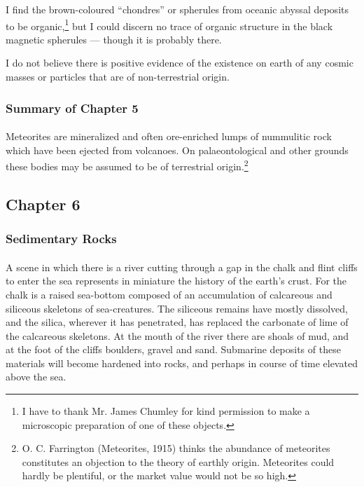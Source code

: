 \documentclass[a4paper, 12pt, oneside]{article}
\begin{document}
I find the brown-coloured ``chondres'' or spherules from oceanic abyssal deposits to be organic,\footnote{I have to thank Mr. James Chumley for kind permission to make a microscopic preparation of one of these objects.} but I could discern no trace of organic structure in the black magnetic spherules --- though it is probably there.

I do not believe there is positive evidence of the existence on earth of any cosmic masses or particles that are of non-terrestrial origin.

\subsubsection{Summary of Chapter 5}
\paragraph{}
Meteorites are mineralized and often ore-enriched lumps of nummulitic rock which have been ejected from volcanoes. On palaeontological and other grounds these bodies may be assumed to be of terrestrial origin.\footnote{O. C. Farrington (Meteorites, 1915) thinks the abundance of meteorites constitutes an objection to the theory of earthly origin. Meteorites could hardly be plentiful, or the market value would not be so high.}
\clearpage
\subsection{Chapter 6}
\subsubsection{Sedimentary Rocks}
\paragraph{}
A scene in which there is a river cutting through a gap in the chalk and flint cliffs to enter the sea represents in miniature the history of the earth's crust. For the chalk is a raised sea-bottom composed of an accumulation of calcareous and siliceous skeletons of sea-creatures. The siliceous remains have mostly dissolved, and the silica, wherever it has penetrated, has replaced the carbonate of lime of the calcareous skeletons. At the mouth of the river there are shoals of mud, and at the foot of the cliffs boulders, gravel and sand. Submarine deposits of these materials will become hardened into rocks, and perhaps in course of time elevated above the sea.
\end{document}
